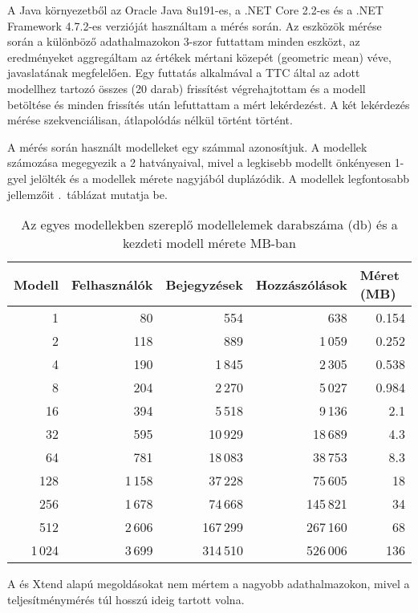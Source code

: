 A Java környezetből az Oracle Java 8u191-es, a .NET Core 2.2-es és a .NET Framework 4.7.2-es verzióját használtam a mérés során. Az eszközök mérése során a különböző adathalmazokon 3-szor futtattam minden eszközt, az eredményeket aggregáltam az értékek mértani közepét (geometric mean) véve, \cite{DBLP:journals/cacm/FlemingW86} javaslatának megfelelően. Egy futtatás alkalmával a TTC által az adott modellhez tartozó összes (20 darab) frissítést végrehajtottam és a modell betöltése és minden frissítés után lefuttattam a mért lekérdezést. A két lekérdezés mérése szekvenciálisan, átlapolódás nélkül történt történt.

A mérés során használt modelleket egy számmal azonosítjuk. A modellek számozása megegyezik a 2 hatványaival, mivel a legkisebb modellt önkényesen 1-gyel jelölték és a modellek mérete nagyjából duplázódik. A modellek legfontosabb jellemzőit .~táblázat mutatja be.
\begin{table}[h]
	\centering
	\begin{tabular}{rrrrr}
		\toprule
		\multicolumn{1}{l}{Modell} & \multicolumn{1}{l}{Felhasználók} & \multicolumn{1}{l}{Bejegyzések}& \multicolumn{1}{l}{Hozzászólások} & \multicolumn{1}{l}{Méret (MB)} \\
		\midrule
		1 & 80 & 554 & 638 & 0.154 \\
		2 & 118 & 889 & 1\,059 & 0.252 \\
		4 & 190 & 1\,845 & 2\,305 & 0.538 \\
		8 & 204 & 2\,270 & 5\,027 & 0.984 \\
		16 & 394 & 5\,518 & 9\,136 & 2.1 \\
		32 & 595 & 10\,929 & 18\,689 & 4.3 \\
		64 & 781 & 18\,083 & 38\,753 & 8.3 \\
		128 & 1\,158 & 37\,228 & 75\,605 & 18 \\
		256 & 1\,678 & 74\,668 & 145\,821 & 34 \\
		512 & 2\,606 & 167\,299 & 267\,160 & 68 \\
		1\,024 & 3\,699 & 314\,510 & 526\,006 & 136 \\
		\bottomrule
	\end{tabular}
	\caption{Az egyes modellekben szereplő modellelemek darabszáma (db) és a kezdeti modell mérete MB-ban}
	\label{tab:ttc-modells}
\end{table}

A \viatra és Xtend alapú megoldásokat nem mértem a nagyobb adathalmazokon, mivel a teljesítménymérés túl hosszú ideig tartott volna.

